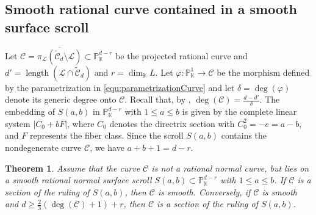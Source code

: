 \documentclass[a4paper, 11pt]{amsart}
\newtheorem{theorem}{Theorem}
\numberwithin{theorem}{section}
\theoremstyle{definition}
\numberwithin{equation}{section}
\begin{document}
\subsection{Smooth rational curve contained in a smooth surface scroll}\label{subsec:smoothcurveinSurface}
Let $\mathcal{C}=\overline{\pi_{\mathcal L}(\widetilde{\mathcal{C}}_d\setminus \mathcal{L})}\subset\mathbb{P}_{\mathbb{K}}^{d-r}$ be the projected rational curve and $d'=\operatorname{length}(\mathcal L\cap\widetilde{\mathcal{C}}_d)$ and $r=\dim_{\mathbb{K}}L$.
Let $\varphi:\mathbb{P}_{\mathbb{K}}^1\to\mathcal{C}$ be the morphism defined by the parametrization in \eqref{equ:parametrizationCurve} and let $\delta=\deg(\varphi)$ denote its generic degree onto $\mathcal{C}$.
Recall that, by , $\deg(\mathcal{C})=\frac{d-d'}{\delta}$.
The embedding of $S(a,b)$ in $\mathbb{P}_{\mathbb{K}}^{d-r}$ with $1 \le a \le b$ is given by the complete linear system $|C_0 + bF|$, where $C_0$ denotes the directrix section with $C_0^2 = -e = a-b$, and $F$ represents the fiber class.
Since the scroll $S(a,b)$ contains the nondegenerate curve $\mathcal{C}$, we have $a+b+1 = d-r$.
\begin{theorem}\label{thm:surface-stable}
Assume that the curve $\mathcal{C}$ is not a rational normal curve, but lies on a smooth rational normal surface scroll $S(a,b) \subset \mathbb{P}_{\mathbb{K}}^{d-r}$ with $1 \le a \le b$.
If $\mathcal{C}$ is a section of the ruling of $S(a,b)$, then $\mathcal{C}$ is smooth. 
Conversely, if $\mathcal{C}$ is smooth and $d\geq \frac{2}{3}(\deg(\mathcal{C})+1) +r$, then $\mathcal{C}$ is a section of the ruling of $S(a,b)$.
\end{theorem}
\end{document}

